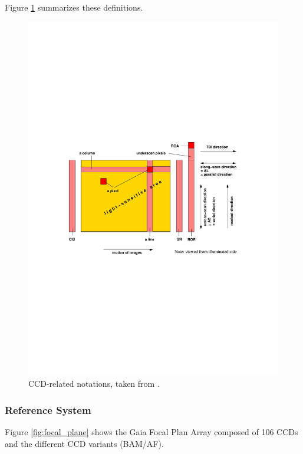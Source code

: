 \documentclass[a4paper, 11pt]{article}
\begin{document}
Figure \ref{fig:CCD_definitions} summarizes these definitions.

\begin{figure}[h!]
  \centering
  \includegraphics[width=.8\textwidth,trim=70 260 100 260 ,clip]{images/ccd}
  \caption{CCD-related notations, taken from \cite{GAIA-CA-SP-ARI-BAS-003}.}
  \label{fig:CCD_definitions}
\end{figure}


\subsubsection{Reference System}
Figure \ref{fig:focal_plane} shows the Gaia Focal Plan Array composed of 106 CCDs and the different CCD variants (BAM/AF).
\end{document}

